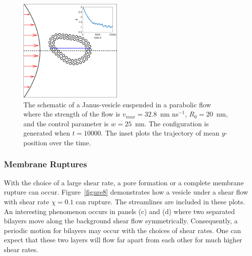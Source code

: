 \documentclass[lineno]{jfm}
\begin{document}
\begin{figure}
\centering
\includegraphics[height=2in]{parabolic.eps}
  \caption{\label{figure7} The schematic of a Janus-vesicle suspended in
  a parabolic flow where the strength of the flow is $v_{max}=32.8$~nm
  ns$^{-1}$, $R_0 = 20$~nm, and the control parameter is $w=25$~nm. The
  configuration is generated when $t=10000$. The inset plots the
  trajectory of mean $y$-position over the time.}
\end{figure}


\subsubsection{Membrane Ruptures}

With the choice of a large shear rate, a pore formation or a complete
membrane rupture can occur. Figure~\ref{figure8} demonstrates how a
vesicle under a shear flow with shear rate $\chi=0.1$ can rupture. The
streamlines are included in these plots. An interesting phenomenon
occurs in panels (c) and (d) where two separated bilayers move along the
background shear flow symmetrically.  Consequently, a periodic motion
for bilayers may occur with the choices of shear rates. One can expect
that these two layers will flow far apart from each other for much
higher shear rates.
\end{document}
